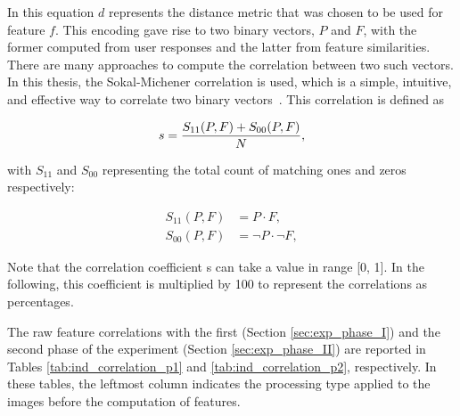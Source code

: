 In this equation $d$ represents the distance metric that was chosen to be used for feature $f$. This encoding gave rise to two binary vectors, $P$ and $F$, with the former computed from user responses and the latter from feature similarities. There are many approaches to compute the correlation between two such vectors. In this thesis, the Sokal-Michener correlation is used, which is a simple, intuitive, and effective way to correlate two binary vectors~\cite{zhang2003properties}. This correlation is defined as

\begin{equation}
s = {{S_{11}(P, F) + S_{00}(P, F)} \over {N}},
\end{equation}

with $S_{11}$ and $S_{00}$ representing the total count of matching ones and zeros respectively:

\begin{align}
    S_{11}(P, F) &= P \cdot F,\\
    S_{00}(P, F) &= \neg P \cdot \neg F, 
\end{align}


Note that the correlation coefficient s can take a value in range [0, 1]. In the following, this coefficient is multiplied by 100 to represent the correlations as percentages.

The raw feature correlations with the first (Section \ref{sec:exp_phase_I}) and the second phase of the experiment (Section \ref{sec:exp_phase_II}) are reported in Tables \ref{tab:ind_correlation_p1} and \ref{tab:ind_correlation_p2}, respectively. In these tables, the leftmost column indicates the processing type applied to the images before the computation of features.

